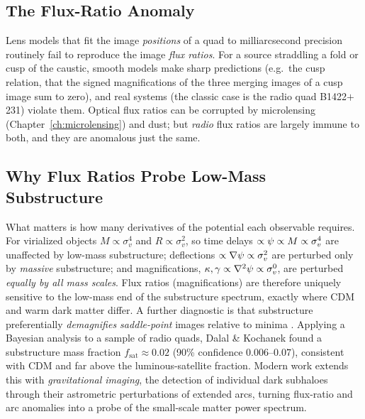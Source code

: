 \subsection{The Flux-Ratio Anomaly}
\label{sec:flux_anomaly}

Lens models that fit the image \emph{positions} of a quad to
milliarcsecond precision routinely fail to reproduce the image
\emph{flux ratios}.  For a source straddling a fold or cusp of the
caustic, smooth models make sharp predictions (e.g.\ the
cusp relation, that the signed magnifications of the three
merging images of a cusp image sum to zero), and real systems (the
classic case is the radio quad B1422$+$231) violate them.  Optical flux
ratios can be corrupted by microlensing (Chapter~\ref{ch:microlensing})
and dust; but \emph{radio} flux ratios are largely immune to both, and
they are anomalous just the same.

\subsection{Why Flux Ratios Probe Low-Mass Substructure}
\label{sec:why_flux}

What matters is how many derivatives of the potential each
observable requires.  For virialized objects $M \propto \sigma_v^4$
and $R \propto \sigma_v^2$, so time delays
$\propto \psi \propto M \propto \sigma_v^4$ are unaffected by
low-mass substructure; deflections
$\propto \nabla\psi \propto \sigma_v^2$ are perturbed only by
\emph{massive} substructure; and magnifications,
$\kappa,\gamma \propto \nabla^2\psi
\propto \sigma_v^0$, are perturbed \emph{equally by all mass
scales}.
Flux ratios (magnifications) are therefore uniquely sensitive to the
low-mass end of the substructure spectrum, exactly where CDM and warm
dark matter differ.  A further diagnostic is that substructure
preferentially \emph{demagnifies saddle-point} images relative to minima
\citep[][Part~2, \S8]{schneider_kochanek_wambsganss_2006}.  Applying a
Bayesian analysis to a sample of radio quads, Dalal \& Kochanek found a
substructure mass fraction $f_{\mathrm{sat}} \approx 0.02$ (90\%
confidence $0.006$--$0.07$), consistent with CDM and far above the
luminous-satellite fraction.  Modern work extends this with
\emph{gravitational imaging}, the detection of individual dark subhaloes
through their astrometric perturbations of extended arcs, turning
flux-ratio and arc anomalies into a probe of the small-scale matter
power spectrum.


